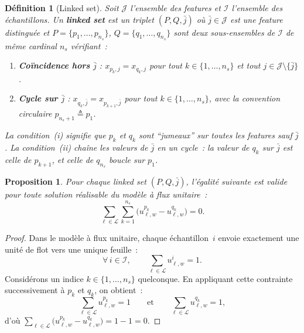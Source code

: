 \documentclass[a4paper,10pt,titlepage,leqno]{article}
\newtheorem{proposition}{Proposition}
\newtheorem{definition}{Définition}
\begin{document}
\begin{theorybox}

\begin{definition}[Linked set]
Soit $\mathcal{J}$ l'ensemble des features et $\mathcal{I}$ l'ensemble des échantillons. Un \textbf{linked set} est un triplet $(P, Q, \bar{j})$ où $\bar{j} \in \mathcal{J}$ est une feature distinguée et $P = \{p_1, \ldots, p_{n_s}\}$, $Q = \{q_1, \ldots, q_{n_s}\}$ sont deux sous-ensembles de $\mathcal{I}$ de même cardinal $n_s$ vérifiant~:
\begin{enumerate}[label=(\roman*)]
  \item \textbf{Coïncidence hors $\bar{j}$} : $x_{p_k, j} = x_{q_k, j}$ pour tout $k \in \{1, \ldots, n_s\}$ et tout $j \in \mathcal{J} \setminus \{\bar{j}\}$.
  \item \textbf{Cycle sur $\bar{j}$} : $x_{q_k, \bar{j}} = x_{p_{k+1}, \bar{j}}$ pour tout $k \in \{1, \ldots, n_s\}$, avec la convention circulaire $p_{n_s+1} \triangleq p_1$.
\end{enumerate}
La condition~(i) signifie que $p_k$ et $q_k$ sont ``jumeaux'' sur toutes les features sauf $\bar{j}$. La condition~(ii) chaîne les valeurs de $\bar{j}$ en un cycle~: la valeur de $q_k$ sur $\bar{j}$ est celle de $p_{k+1}$, et celle de $q_{n_s}$ boucle sur $p_1$.
\end{definition}

\begin{proposition}
Pour chaque linked set $(P, Q, \bar{j})$, l'égalité suivante est valide pour toute solution réalisable du modèle à flux unitaire~:
\begin{equation}
  \sum_{\ell \in \mathcal{L}} \sum_{k=1}^{n_s} \bigl( u_{\ell,w}^{p_k} - u_{\ell,w}^{q_k} \bigr) = 0.
  \label{eq:linked}
\end{equation}
\end{proposition}

\begin{proof}
Dans le modèle à flux unitaire, chaque échantillon~$i$ envoie exactement une unité de flot vers une unique feuille~:
\[
  \forall\, i \in \mathcal{I}, \qquad \sum_{\ell \in \mathcal{L}} u_{\ell,w}^{i} = 1.
\]
Considérons un indice $k \in \{1, \ldots, n_s\}$ quelconque. En appliquant cette contrainte successivement à $p_k$ et $q_k$, on obtient~:
\[
  \sum_{\ell \in \mathcal{L}} u_{\ell,w}^{p_k} = 1 \qquad \text{et} \qquad \sum_{\ell \in \mathcal{L}} u_{\ell,w}^{q_k} = 1,
\]
d'où $\sum_{\ell \in \mathcal{L}} \bigl( u_{\ell,w}^{p_k} - u_{\ell,w}^{q_k} \bigr) = 1 - 1 = 0$.


\end{proof}
\end{theorybox}
\end{document}
